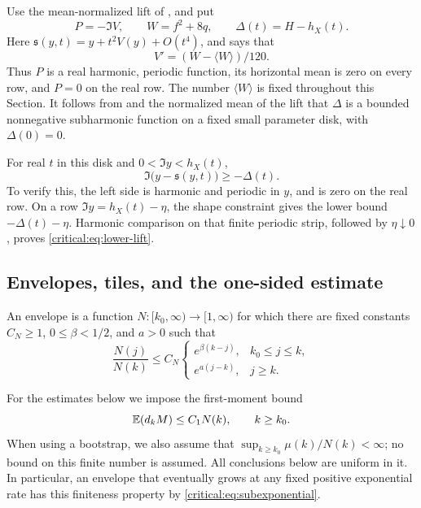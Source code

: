 Use the mean-normalized lift of , and put
\begin{equation}\label{critical:eq:P-and-deficit}
 P=-\Im V,\qquad W=f^2+8q,\qquad \Delta(t)=H-h_X(t).
\end{equation}
Here \(\mathfrak s(y,t)=y+t^2V(y)+O(t^4)\), and
 says that
\begin{equation}\label{critical:eq:gradient}
 V'=(W-\langle W\rangle)/120.
\end{equation}
Thus \(P\) is a real harmonic, periodic function, its horizontal mean
is zero on every row, and \(P=0\) on the real row. The number
\(\langle W\rangle\) is fixed throughout this Section. It follows from
 and the normalized mean of the lift that
\(\Delta\) is a bounded nonnegative subharmonic function on a fixed
small parameter disk, with \(\Delta(0)=0\).

For real \(t\) in this disk and \(0<\Im y<h_X(t)\),
\begin{equation}\label{critical:eq:lower-lift}
 \Im\bigl(y-\mathfrak s(y,t)\bigr)\ge-\Delta(t).
\end{equation}
To verify this, the left side is harmonic and periodic in \(y\), and
is zero on the real row. On a row \(\Im y=h_X(t)-\eta\), the shape
constraint gives the lower bound \(-\Delta(t)-\eta\). Harmonic
comparison on that finite periodic strip, followed by \(\eta\downarrow0\),
proves \eqref{critical:eq:lower-lift}.

\subsection{Envelopes, tiles, and the one-sided estimate}

\begin{definition}\label{critical:def:envelope}
An envelope is a function \(N:[k_0,\infty)\to[1,\infty)\) for which
there are fixed constants \(C_N\ge1\), \(0\le\beta<1/2\), and
\(a>0\) such that
\begin{equation}\label{critical:eq:envelope}
 \frac{N(j)}{N(k)}\le C_N
 \begin{cases}
 e^{\beta(k-j)},& k_0\le j\le k,\\
 e^{a(j-k)},& j\ge k.
 \end{cases}
\end{equation}
\end{definition}

For the estimates below we impose the first-moment bound
\begin{equation}\label{critical:eq:first-moment}
 \mathbb E(d_kM)\le C_1N(k),\qquad k\ge k_0.
\end{equation}
When using a bootstrap, we also assume that
\(\sup_{k\ge k_0}\mu(k)/N(k)<\infty\); no bound on this finite
number is assumed. All conclusions below are uniform in it. In
particular, an envelope that eventually grows at any fixed positive
exponential rate has this finiteness property by
\eqref{critical:eq:subexponential}.

